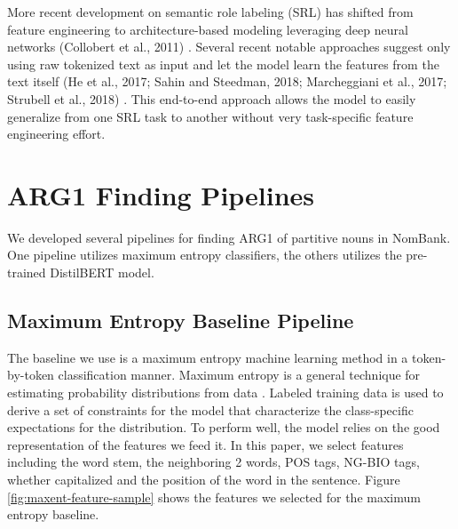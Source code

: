 \documentclass[11pt]{article}
\begin{document}
More recent development on semantic role labeling (SRL) has shifted from feature engineering to architecture-based modeling leveraging deep neural networks (Collobert et al., 2011) \cite{collobert2011natural}. Several recent notable approaches suggest only using raw tokenized text as input and let the model learn the features from the text itself (He et al., 2017; Sahin and Steedman, 2018; Marcheggiani et al., 2017; Strubell et al., 2018) \cite{he2017deep,csahin2018character,marcheggiani2017encoding,strubell2018linguistically}. This end-to-end approach allows the model to easily generalize from one SRL task to another without very task-specific feature engineering effort.

\section{ARG1 Finding Pipelines}

We developed several pipelines for finding ARG1 of partitive nouns in NomBank. One pipeline utilizes maximum entropy classifiers, the others utilizes the pre-trained DistilBERT model.

\subsection{Maximum Entropy Baseline Pipeline}

The baseline we use is a maximum entropy machine learning method in a token-by-token classification manner. Maximum entropy is a general technique for estimating probability distributions from data \cite{berger1996maximum}. Labeled training data
is used to derive a set of constraints for the model that
characterize the class-specific expectations for the distribution. To perform well, the model relies on the good representation of the features we feed it. In this paper, we select features including the word stem, the neighboring 2 words, POS tags, NG-BIO tags, whether capitalized and the position of the word in the sentence. Figure \ref{fig:maxent-feature-sample} shows the features we selected for the maximum entropy baseline.
\end{document}
